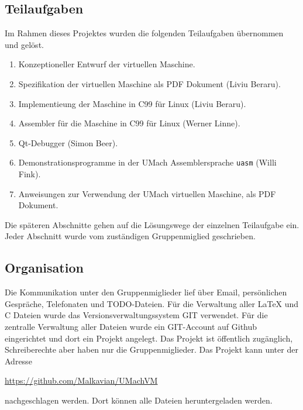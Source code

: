 \subsection{Teilaufgaben}

Im Rahmen dieses Projektes wurden die folgenden Teilaufgaben übernommen und
gelöst.

\begin{enumerate}
\item Konzeptioneller Entwurf der virtuellen Maschine.
\item Spezifikation der virtuellen Maschine als PDF Dokument (Liviu Beraru).
\item Implementieung der Maschine in C99 für Linux (Liviu Beraru).
\item Assembler für die Maschine in C99 für Linux (Werner Linne).
\item Qt-Debugger (Simon Beer).
\item Demonstrationsprogramme in der UMach Assemblersprache \texttt{uasm} 
      (Willi Fink).
\item Anweisungen zur Verwendung der UMach virtuellen Maschine, als PDF
Dokument.
\end{enumerate}

Die späteren Abschnitte gehen auf die Lösungswege der einzelnen Teilaufgabe
ein. Jeder Abschnitt wurde vom zuständigen Gruppenmiglied geschrieben.


\subsection{Organisation}

Die Kommunikation unter den Gruppenmiglieder lief über Email, persönlichen
Gespräche, Telefonaten und TODO-Dateien. Für die Verwaltung aller \LaTeX{} und C
Dateien wurde das Versionsverwaltungssystem GIT verwendet. Für die zentralle
Verwaltung aller Dateien wurde ein GIT-Account auf Github eingerichtet und dort
ein Projekt angelegt. Das Projekt ist öffentlich zugänglich, Schreiberechte aber
haben nur die Gruppenmiglieder. Das Projekt kann unter der Adresse

\url{https://github.com/Malkavian/UMachVM}

nachgeschlagen werden. Dort können alle Dateien heruntergeladen werden.
